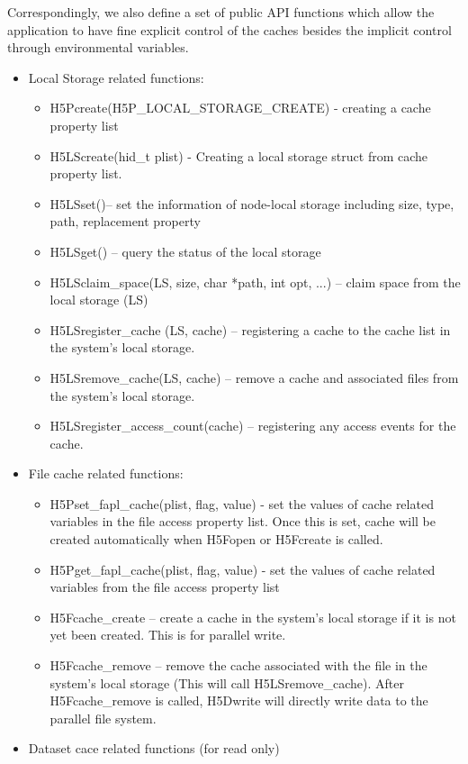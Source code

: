 \documentclass[aps, rmp, 11pt, notitlepage]{revtex4-1}
\begin{document}
Correspondingly, we also define a set of public API functions which allow the application to have fine explicit control of the caches besides the implicit control through environmental variables. 
\begin{itemize} \item Local Storage related functions: 
\begin{itemize}
\item H5Pcreate(H5P\_LOCAL\_STORAGE\_CREATE) - creating a cache property list
\item H5LScreate(hid\_t plist) - Creating a local storage struct from cache property list.
\item H5LSset()-- set the information of node-local storage including size, type, path, replacement property
\item H5LSget() -- query the status of the local storage
\item H5LSclaim\_space(LS, size, char *path, int opt, ...) -- claim space from the local storage (LS)
\item H5LSregister\_cache (LS, cache) -- registering a cache to the cache list in the system’s local storage.
\item H5LSremove\_cache(LS, cache) -- remove a cache and associated files from the system’s local storage.
\item H5LSregister\_access\_count(cache) -- registering any access events for the cache.
\end{itemize}
\item File cache related functions:
\begin{itemize}
\item H5Pset\_fapl\_cache(plist, flag, value) - set the values of cache related variables in the file access property list. Once this is set, cache will be created automatically when H5Fopen or H5Fcreate is called.
\item H5Pget\_fapl\_cache(plist, flag, value) - set the values of cache related variables from the file access property list
\item H5Fcache\_create -- create a cache in the system’s local storage if it is not yet been created. This is for parallel write. 
\item H5Fcache\_remove -- remove the cache associated with the file in the system's local storage (This will call H5LSremove\_cache). After H5Fcache\_remove is called, H5Dwrite will directly write data to the parallel file system. 
\end{itemize}
\item Dataset cace related functions (for read only)

\end{itemize}
\end{document}
